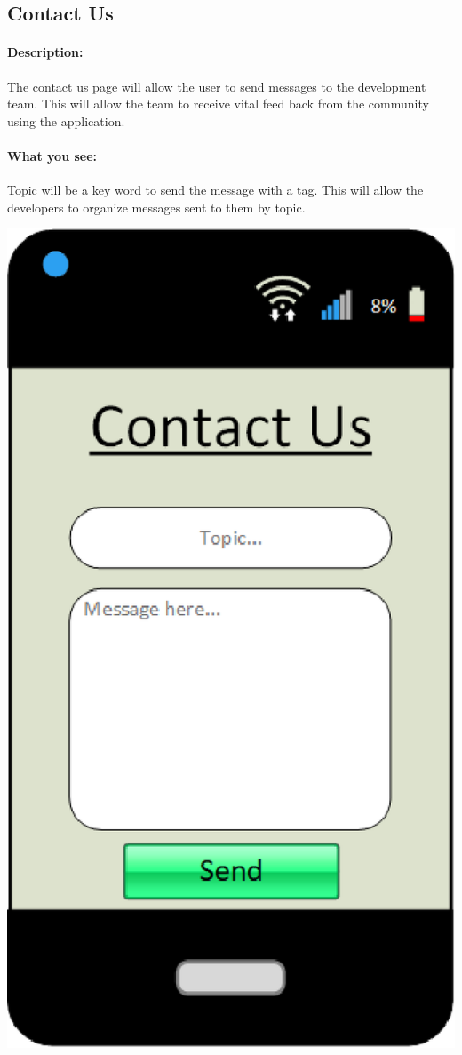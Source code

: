 \documentclass[a4paper]{article}
\begin{document}
\subsection{Contact Us}
\paragraph{Description:} The contact us page will allow the user to send messages to the development team. This will allow the team to receive vital feed back from the community using the application.
\paragraph{What you see:} Topic will be a key word to send the message with a tag. This will allow the developers to organize messages sent to them by topic.
\begin{center}\includegraphics[scale=.8]{ContactUs.eps}\end{center}
\pagebreak
\end{document}

